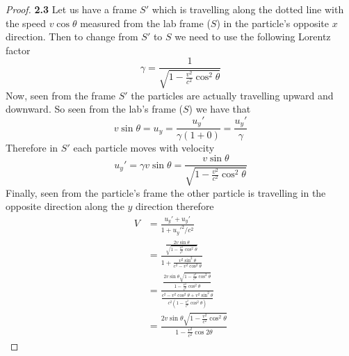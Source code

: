 \documentclass[11pt]{article}
\theoremstyle{definition}
\begin{document}
	\begin{proof}{\textbf{2.3}}
        Let us have a frame $S'$ which is travelling along the dotted line with the speed
        $v \cos\theta$ measured from the lab frame ($S$) in the particle's opposite
        $x$ direction. Then to change from $S'$ to $S$ we need to use the following Lorentz
        factor
        $$\gamma = \frac{1}{\sqrt{1 - \frac{v^2}{c^2}\cos^2\theta}}$$
        Now, seen from the frame $S'$ the particles are actually travelling upward and
        downward. So seen from the lab's frame ($S$) we have that
        $$v\sin\theta = u_y = \frac{u_y'}{\gamma(1 + 0)} = \frac{u_y'}{\gamma}$$
        Therefore in $S'$ each particle moves with velocity
        $$u_y' = \gamma v\sin\theta = \frac{v\sin\theta}{\sqrt{1 - \frac{v^2}{c^2}\cos^2\theta}}$$
        Finally, seen from the particle's frame the other particle is travelling in the
        opposite direction along the $y$ direction therefore
        \begin{align*}
            V &= \frac{u_y' + u_y'}{1 + u_y'^2/c^2}\\
              &=\frac{\frac{2v\sin\theta}{\sqrt{1 - \frac{v^2}{c^2}\cos^2\theta}}}
              {1 + \frac{v^2\sin^2\theta}{c^2 - v^2\cos^2\theta}}\\
              &= \frac{\frac{2v\sin\theta\sqrt{1 - \frac{v^2}{c^2}\cos^2\theta}}{1 - \frac{v^2}{c^2}\cos^2\theta}}
              {\frac{c^2 - v^2\cos^2\theta + v^2\sin^2\theta}{c^2(1 - \frac{v^2}{c^2}\cos^2\theta)}}\\
              &= \frac{2v\sin\theta\sqrt{1 - \frac{v^2}{c^2}\cos^2\theta}}
              {1 - \frac{v^2}{c^2}\cos 2\theta}
        \end{align*}
    \end{proof}
\end{document}
